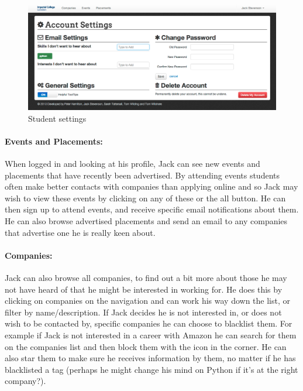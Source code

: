     \begin{figure}[H]\centering
    \includegraphics[scale=0.3]{images/user_experiences/student/account_settings}
    \caption{Student settings}
    \end{figure}

  \paragraph{Events and Placements:}
    When logged in and looking at his profile, Jack can see new events and placements that have recently been advertised. By attending events students often make better contacts with companies than applying online and so Jack may wish to view these events by clicking on any of these or the all button. He can then sign up to attend events, and receive specific email notifications about them.
    He can also browse advertised placements and send an email to any companies that advertise one he is really keen about.


  \paragraph{Companies:}
    Jack can also browse all companies, to find out a bit more about those he may not have heard of that he might be interested in working for. He does this by clicking on companies on the navigation and can work his way down the list, or filter by name/description.
    If Jack decides he is not interested in, or does not wish to be contacted by, specific companies he can choose to blacklist them. For example if Jack is not interested in a career with Amazon he can search for them on the companies list and then block them with the icon in the corner. He can also star them to make sure he receives information by them, no matter if he has blacklisted a tag (perhaps he might change his mind on Python if it's at the right company?).


